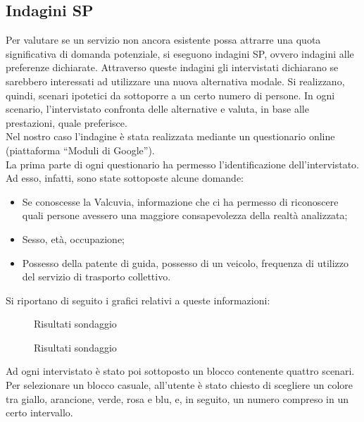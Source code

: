 \documentclass{article}
\begin{document}
\subsection{Indagini SP}
Per valutare se un servizio non ancora esistente possa attrarre una quota significativa di domanda potenziale, si eseguono indagini SP, ovvero indagini alle preferenze dichiarate. Attraverso queste indagini gli intervistati dichiarano se sarebbero interessati ad utilizzare una nuova alternativa modale. Si realizzano, quindi, scenari ipotetici da sottoporre a un certo numero di persone. In ogni scenario, l’intervistato confronta delle alternative e valuta, in base alle prestazioni, quale preferisce.\\
Nel nostro caso l’indagine è stata realizzata mediante un questionario online (piattaforma “Moduli di Google”).\\
La prima parte di ogni questionario ha permesso l’identificazione dell’intervistato. Ad esso, infatti, sono state sottoposte alcune domande:
\begin{itemize}
\item Se conoscesse la Valcuvia, informazione che ci ha permesso di riconoscere quali persone avessero una maggiore consapevolezza della realtà analizzata;
\item Sesso, età, occupazione;
\item Possesso della patente di guida, possesso di un veicolo, frequenza di utilizzo del servizio di trasporto collettivo.
\end{itemize}
Si riportano di seguito i grafici relativi a queste informazioni:\\
\begin{figure}[H]
\centering
{}
\qquad
{}
\qquad
{}
\qquad
{}
\caption{Risultati sondaggio}
\end{figure}
\begin{figure}[H]
\centering
{}
\qquad
{}
\qquad
{}
\caption{Risultati sondaggio}
\end{figure}
Ad ogni intervistato è stato poi sottoposto un blocco contenente quattro scenari. Per selezionare un blocco casuale, all’utente è stato chiesto di scegliere un colore tra giallo, arancione, verde, rosa e blu, e, in seguito, un numero compreso in un certo intervallo.\\
\end{document}
